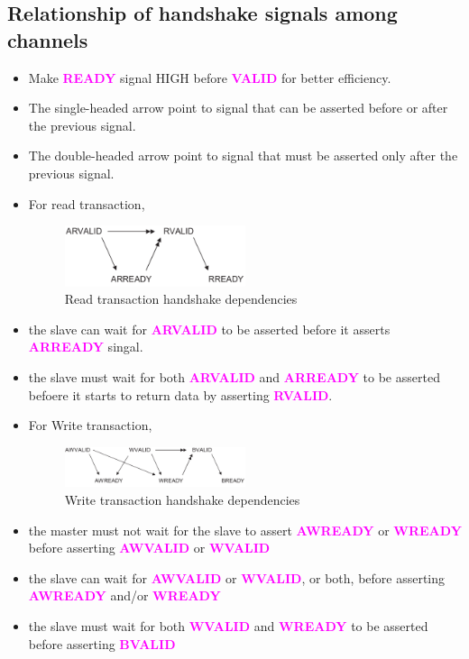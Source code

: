 \documentclass{article}
\newcommand{\AXISignals}[1]{\textbf{\textcolor{magenta}{#1}}}
\begin{document}
\subsection{Relationship of handshake signals among channels}
\begin{itemize}
    \item Make \AXISignals{READY} signal HIGH before \AXISignals{VALID} for better efficiency.
    \item The single-headed arrow point to signal that can be asserted before or after the previous signal.
    \item The double-headed arrow point to signal that must be asserted only after the previous signal.
    \item For read transaction,
\begin{figure}[H]
    \centering
    \includegraphics[width=0.5\textwidth]{Resources/ReadtransactionHandshakeDependencies.png}
    \caption{Read transaction handshake dependencies}
\end{figure}
    \item the slave can wait for \AXISignals{ARVALID} to be asserted before it asserts \AXISignals{ARREADY} singal.
    \item the slave must wait for both \AXISignals{ARVALID} and \AXISignals{ARREADY} to be asserted befoere it starts to return data by asserting \AXISignals{RVALID}.
    \item For Write transaction,
    \begin{figure}[H]
        \centering
        \includegraphics[width=0.5\textwidth]{Resources/WritetransactionHandshakeDependencies.png}
        \caption{Write transaction handshake dependencies}
    \end{figure}
    \item the master must not wait for the slave to assert \AXISignals{AWREADY} or \AXISignals{WREADY} before asserting \AXISignals{AWVALID} or \AXISignals{WVALID}
    \item the slave can wait for \AXISignals{AWVALID} or \AXISignals{WVALID}, or both, before asserting \AXISignals{AWREADY} and/or \AXISignals{WREADY}
    \item the slave must wait for both \AXISignals{WVALID} and \AXISignals{WREADY} to be asserted before asserting \AXISignals{BVALID}
\end{itemize}
\end{document}
